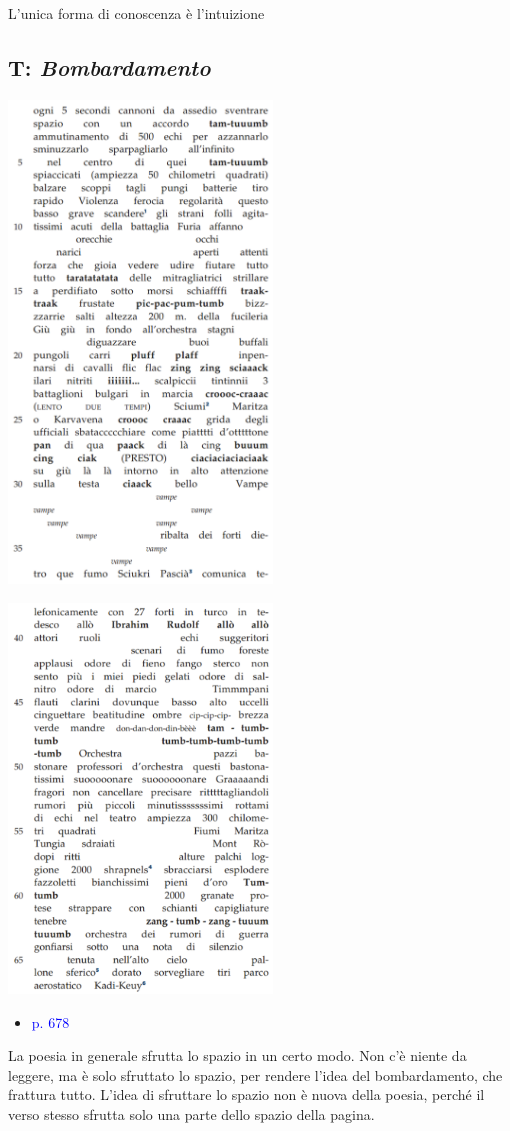 \documentclass[a4paper, twoside, titlepage]{book}
\newcommand{\elenco}[1]{%
\begin{itemize}
#1
\end{itemize}}
\renewcommand{\emph}[1]{\textcolor{blue}{#1}}
\begin{document}
L’unica forma di conoscenza è l’intuizione
\vfill
\null
\begin{minipage}{\textwidth}
\subsection{T: \textit{Bombardamento}}
\null\hfill\includegraphics[width=7cm]{bombardamento1}\hfill\null
\end{minipage}

\null\hfill\includegraphics[width=7cm]{bombardamento2}\hfill\null
\elenco{\item \emph{p. 678}}
La poesia in generale sfrutta lo spazio in un certo modo. Non c’è niente da leggere, ma è solo sfruttato lo spazio, per rendere l’idea del bombardamento, che frattura tutto.
L’idea di sfruttare lo spazio non è nuova della poesia, perché il verso stesso sfrutta solo una parte dello spazio della pagina.
\end{document}
